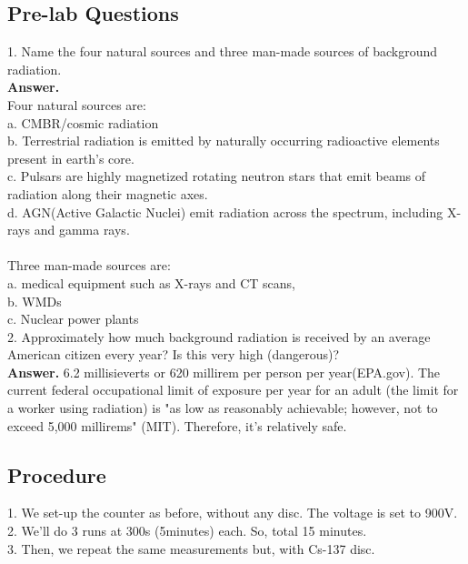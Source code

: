 \documentclass[twocolumn]{article}
\begin{document}
\subsection*{Pre-lab Questions}
1. Name the four natural sources and three man-made sources of background radiation.\\
\textbf{Answer.}\\ Four natural sources are:\\
a. CMBR/cosmic radiation\\
b. Terrestrial radiation is emitted by naturally occurring radioactive elements present in earth's core.\\
c. Pulsars are highly magnetized rotating neutron stars that emit beams of radiation along their magnetic axes.\\
d. AGN(Active Galactic Nuclei) emit radiation across the spectrum, including X-rays and gamma rays.\\
\\
Three man-made sources are:\\
a. medical equipment such as X-rays and CT scans,\\
b. WMDs\\
c. Nuclear power plants\\
$$$$ 
2. Approximately how much background radiation is received by an average American citizen every year? Is this very high (dangerous)?\\
\textbf{Answer.} 6.2 millisieverts or 620 millirem per person per year(EPA.gov). The current federal occupational limit of exposure per year for an adult (the limit for a worker using radiation) is "as low as reasonably achievable; however, not to exceed 5,000 millirems" (MIT). Therefore, it's relatively safe.

\subsection*{Procedure}
1. We set-up the counter as before, without any disc. The voltage is set to 900V.\\
2. We'll do 3 runs at 300s (5minutes) each. So, total 15 minutes.\\
3. Then, we repeat the same measurements but, with Cs-137 disc.\\
\end{document}
